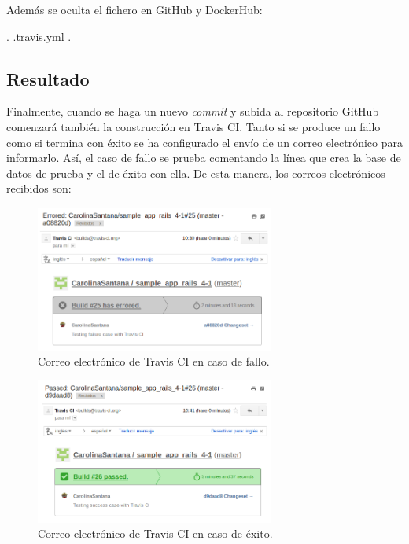 Además se oculta el fichero  en GitHub y DockerHub:

\begin{codelisting}
\label{code:scriptdocker}
\begin{code}
.
.travis.yml
.
\end{code}
\end{codelisting}

\subsection{Resultado}

Finalmente, cuando se haga un nuevo \textit{commit} y subida al repositorio GitHub comenzará también la construcción en Travis CI. Tanto si se produce un fallo como si termina con éxito se ha configurado el envío de un correo electrónico para informarlo. Así, el caso de fallo se prueba comentando la línea que crea la base de datos de prueba  y el de éxito con ella. De esta manera, los correos electrónicos recibidos son:

\begin{figure}[H]
\centering
\includegraphics[width=0.7\textwidth]{images/figures/travisfailure.png}
\caption{Correo electrónico de Travis CI en caso de fallo.}
\end{figure}

\begin{figure}[H]
\centering
\includegraphics[width=0.7\textwidth]{images/figures/travissuccess.png}
\caption{Correo electrónico de Travis CI en caso de éxito.}
\end{figure}

